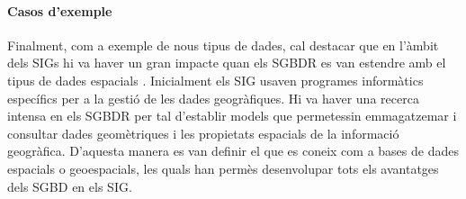 








\paragraph{Casos d'exemple}
Finalment, com a exemple de nous tipus de dades, cal destacar que en
l'àmbit dels \glspl{SIG} hi va haver un gran impacte quan els
\gls{SGBDR} es van estendre amb el tipus de dades
espacials \parencite{nunes13:icc_geospacial}.  Inicialment els
\gls{SIG} usaven programes informàtics específics per a la gestió de
les dades geogràfiques. Hi va haver una recerca intensa en els
\gls{SGBDR} per tal d'establir models que permetessin emmagatzemar i
consultar dades geomètriques i les propietats espacials de la
informació geogràfica. D'aquesta manera es van definir el que es
coneix com a bases de dades espacials o geoespacials, les quals han
permès desenvolupar tots els avantatges dels \gls{SGBD} en els
\gls{SIG}. %



